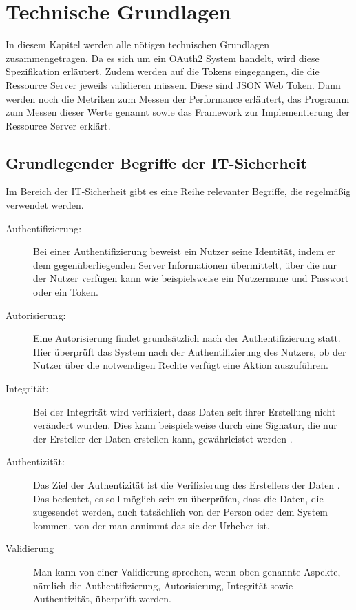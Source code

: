 \chapter{Technische Grundlagen}
\label{sec:TechnischeGrundlagen}
In diesem Kapitel werden alle nötigen technischen Grundlagen zusammengetragen. Da es sich um ein OAuth2 System handelt, wird diese Spezifikation erläutert. Zudem werden auf die Tokens eingegangen, die die Ressource Server jeweils validieren müssen. Diese sind \ac{JSON} Web Token. Dann werden noch die Metriken zum Messen der Performance erläutert, das Programm zum Messen dieser Werte genannt sowie das Framework zur Implementierung der Ressource Server erklärt. 

%
%
\section{Grundlegender Begriffe der IT-Sicherheit}
\label{sec:GrundlegenderBegriffederIT-Sicherheit}
Im Bereich der IT-Sicherheit gibt es eine Reihe relevanter Begriffe, die regelmäßig verwendet werden.

\begin{description}
  \item[Authentifizierung:] Bei einer Authentifizierung beweist ein Nutzer seine Identität, indem er dem gegenüberliegenden Server Informationen übermittelt, über die nur der Nutzer verfügen kann wie beispielsweise ein Nutzername und Passwort oder ein Token.
  \item[Autorisierung:] Eine Autorisierung findet grundsätzlich nach der Authentifizierung statt. Hier überprüft das System nach der Authentifizierung des Nutzers, ob der Nutzer über die notwendigen Rechte verfügt eine Aktion auszuführen. 
  \item[Integrität:] Bei der Integrität wird verifiziert, dass Daten seit ihrer Erstellung nicht verändert wurden. Dies kann beispielsweise durch eine Signatur, die nur der Ersteller der Daten erstellen kann, gewährleistet werden \citep{connect2id}.
  \item[Authentizität:] Das Ziel der Authentizität ist die Verifizierung des Erstellers der Daten \citep{connect2id}. Das bedeutet, es soll möglich sein zu überprüfen, dass die Daten, die zugesendet werden, auch tatsächlich von der Person oder dem System kommen, von der man annimmt das sie der Urheber ist.
  \item[Validierung] Man kann von einer Validierung sprechen, wenn oben genannte Aspekte, nämlich die Authentifizierung, Autorisierung, Integrität sowie Authentizität, überprüft werden.
\end{description}

